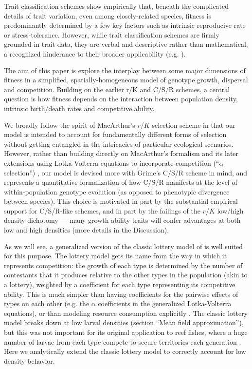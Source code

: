 \documentclass[11pt]{article}
\begin{document}
Trait classification schemes show empirically that, beneath the complicated details of trait variation, even among closely-related species, fitness is predominantly determined by a few key factors such as intrinsic reproducive rate or stress-tolerance. However, while trait classification schemes are firmly grounded in trait data, they are verbal and descriptive rather than mathematical, a recognized hinderance to their broader applicability (e.g. \citealt{tilman_2007}). 

The aim of this paper is explore the interplay between some major dimensions of fitness in a simplified, spatially-homogeneous model of genotype growth, dispersal and competition. Building on the earlier r/K and C/S/R schemes, a central question is how fitness depends on the interaction between population density, intrinsic birth/death rates and competitive ability. 

We broadly follow the spirit of MacArthur's $r$/$K$ selection scheme in that our model is intended to account for fundamentally different forms of selection without getting  entangled in the intricacies of particular ecological scenarios. However, rather than building directly on MacArthur's formalism and its later extensions using Lotka-Volterra equations to incorporate competition (``$\alpha$-selection'') \citep{gill_1974,case_1974,joshi_2001}, our model is devised more with Grime's C/S/R scheme in mind, and represents a quantitative formalization of how C/S/R manifests at the level of within-population genotype evolution (as opposed to phenotypic divergence between species). This choice is motivated in part by the substantial empirical support for C/S/R-like schemes, and in part by the failings of the $r$/$K$ low/high density dichotomy --- many growth ability traits will confer advantages at both low and high densities (more details in the Discussion). 

As we will see, a generalized version of the classic lottery model of \cite{chesson_1981} is well suited for this purpose. The lottery model gets its name from the way in which it represents competition: the growth of each type is determined by the number of contestants that it produces relative to the other types in the population (akin to a lottery),  weighted by a coefficient for each type representing its competitive ability. This is much simpler than having coefficients for the pairwise effects of types on each other (e.g. the $\alpha$ coefficients in the generalized Lotka-Volterra equations), or than modeling resource consumption explicitly \citep{tilman_1982}. The classic lottery model  breaks down at low larval densities (section ``Mean field approximation''), but this was not important for its original application to reef fishes, where a huge number of larvae from each type compete to secure territories each generation \citep{chesson_1981}. Here we analytically extend the classic lottery model to correctly account for low density behavior. 
\end{document}
